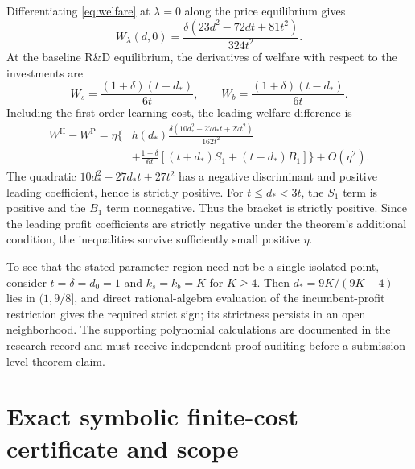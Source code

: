 \documentclass[11pt,a4paper]{article}
\numberwithin{equation}{section}
\theoremstyle{remark}
\newcommand{\PP}{\mathrm{P}}
\newcommand{\HH}{\mathrm{H}}
\begin{document}
Differentiating \eqref{eq:welfare} at $\lambda=0$ along the price equilibrium gives
\[
W_\lambda(d,0)=
\frac{\delta(23d^2-72dt+81t^2)}{324t^2}.
\]
At the baseline R\&D equilibrium, the derivatives of welfare with respect to the investments are
\[
W_s=\frac{(1+\delta)(t+d_*)}{6t},\qquad
W_b=\frac{(1+\delta)(t-d_*)}{6t}.
\]
Including the first-order learning cost, the leading welfare difference is
\begin{align}
W^{\HH}-W^{\PP}
=\eta\Bigg\{&
h(d_*)\frac{\delta(10d_*^2-27d_*t+27t^2)}{162t^2}\nonumber\\
&+\frac{1+\delta}{6t}
\left[(t+d_*)S_1+(t-d_*)B_1\right]
\Bigg\}+O(\eta^2).\label{eq:wcoef}
\end{align}
The quadratic $10d_*^2-27d_*t+27t^2$ has a negative discriminant and positive leading coefficient, hence is strictly positive. For $t\le d_*<3t$, the $S_1$ term is positive and the $B_1$ term nonnegative. Thus the bracket is strictly positive. Since the leading profit coefficients are strictly negative under the theorem's additional condition, the inequalities survive sufficiently small positive $\eta$.

To see that the stated parameter region need not be a single isolated point, consider $t=\delta=d_0=1$ and $k_s=k_b=K$ for $K\ge4$. Then $d_*=9K/(9K-4)$ lies in $(1,9/8]$, and direct rational-algebra evaluation of the incumbent-profit restriction gives the required strict sign; its strictness persists in an open neighborhood. The supporting polynomial calculations are documented in the research record and must receive independent proof auditing before a submission-level theorem claim.

\section{Exact symbolic finite-cost certificate and scope}\label{app:finite}
\end{document}
